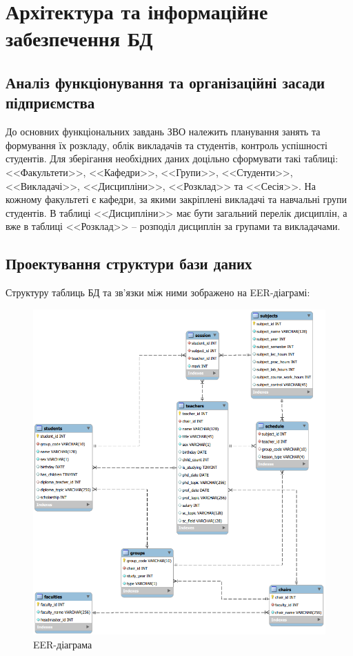 \newpage
\chapter{Архітектура та інформаційне забезпечення БД}
\section{Аналіз функціонування та організаційні засади підприємства}
До основних функціональних завдань ЗВО належить планування занять та формування їх розкладу,
облік викладачів та студентів, контроль успішності студентів.
Для зберігання необхідних даних доцільно сформувати такі таблиці:
<<Факультети>>, <<Кафедри>>, <<Групи>>, <<Студенти>>, <<Викладачі>>, 
<<Дисципліни>>, <<Розклад>> та <<Сесія>>. На кожному факультеті є кафедри,
за якими закріплені викладачі та навчальні групи студентів. В таблиці <<Дисципліни>>
має бути загальний перелік дисциплін, а вже в таблиці <<Розклад>> -- розподіл
дисциплін за групами та викладачами.

\section{Проектування структури бази даних}
Структуру таблиць БД та зв'язки між ними зображено на EER-діаграмі:
\begin{figure}[h]
    \centering
    \includegraphics[scale=0.8]{pics/eer.png}
    \caption{EER-діаграма}
\end{figure}

